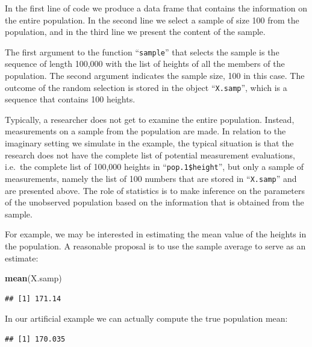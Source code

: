 \documentclass[
]{krantz}
\makeatletter
\newenvironment{Shaded}{\begin{snugshade}}{\end{snugshade}}
\newcommand{\FloatTok}[1]{\textcolor[rgb]{0.00,0.00,0.81}{#1}}
\newcommand{\KeywordTok}[1]{\textcolor[rgb]{0.13,0.29,0.53}{\textbf{#1}}}
\newcommand{\NormalTok}[1]{#1}
\newcommand{\OperatorTok}[1]{\textcolor[rgb]{0.81,0.36,0.00}{\textbf{#1}}}
\newenvironment{kframe}{%
\medskip{}
\setlength{\fboxsep}{.8em}
 \def\at@end@of@kframe{}%
 \ifinner\ifhmode%
  \def\at@end@of@kframe{\end{minipage}}%
  \begin{minipage}{\columnwidth}%
 \fi\fi%
 \def\FrameCommand##1{\hskip\@totalleftmargin \hskip-\fboxsep
 \colorbox{shadecolor}{##1}\hskip-\fboxsep
     \hskip-\linewidth \hskip-\@totalleftmargin \hskip\columnwidth}%
 \MakeFramed {\advance\hsize-\width
   \@totalleftmargin\z@ \linewidth\hsize
   \@setminipage}}%
 {\par\unskip\endMakeFramed%
 \at@end@of@kframe}
\renewenvironment{Shaded}{\begin{kframe}}{\end{kframe}}
\theoremstyle{definition}
\theoremstyle{definition}
\theoremstyle{definition}
\theoremstyle{remark}
\makeatother
\begin{document}
In the first line of code we produce a data frame that contains the
information on the entire population. In the second line we select a
sample of size 100 from the population, and in the third line we present
the content of the sample.

The first argument to the function ``\texttt{sample}'' that selects the sample is
the sequence of length 100,000 with the list of heights of all the
members of the population. The second argument indicates the sample
size, 100 in this case. The outcome of the random selection is stored in
the object ``\texttt{X.samp}'', which is a sequence that contains 100 heights.

Typically, a researcher does not get to examine the entire population.
Instead, measurements on a sample from the population are made. In
relation to the imaginary setting we simulate in the example, the
typical situation is that the research does not have the complete list
of potential measurement evaluations, i.e.~the complete list of 100,000
heights in ``\texttt{pop.1\$height}'', but only a sample of measurements, namely
the list of 100 numbers that are stored in ``\texttt{X.samp}'' and are presented
above. The role of statistics is to make inference on the parameters of
the unobserved population based on the information that is obtained from
the sample.

For example, we may be interested in estimating the mean value of the
heights in the population. A reasonable proposal is to use the sample
average to serve as an estimate:

\begin{Shaded}
\begin{Highlighting}[]
\KeywordTok{mean}\NormalTok{(X.samp)}
\end{Highlighting}
\end{Shaded}

\begin{verbatim}
## [1] 171.14
\end{verbatim}

In our artificial example we can actually compute the true population
mean:

\begin{Shaded}
\end{Shaded}

\begin{verbatim}
## [1] 170.035
\end{verbatim}
\end{document}
